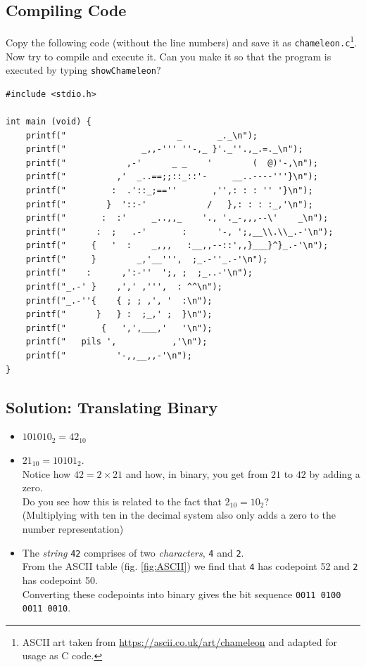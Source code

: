 \subsection*{Compiling Code}
Copy the following code (without the line numbers) and save it as \texttt{chameleon.c}\footnote{ASCII art taken from \url{https://ascii.co.uk/art/chameleon} and adapted for usage as C code.}. Now try to compile and execute it. Can you make it so that the program is executed by typing \texttt{showChameleon}?

\begin{codebox}[chameleon.c]
\begin{verbatim}
#include <stdio.h>

int main (void) {
	printf("                      _       _._\n");
	printf("               _,,-''' ''-,_ }'._''.,_.=._\n");
	printf("            ,-'      _ _    '        (  @)'-,\n");
	printf("          ,'  _..==;;::_::'-     __..----'''}\n");
	printf("         :  .'::_;==''       ,'',: : : '' '}\n");
	printf("        }  '::-'            /   },: : : :_,'\n");
	printf("       :  :'     _..,,_    '., '._-,,,--\'    _\n");
	printf("      :  ;   .-'       :      '-, ';,__\\.\\_.-'\n");
	printf("     {   '  :    _,,,   :__,,--::',,}___}^}_.-'\n");
	printf("     }        _,'__''',  ;_.-''_.-'\n");
	printf("    :      ,':-''  ';, ;  ;_..-'\n");
	printf("_.-' }    ,',' ,''',  : ^^\n");
	printf("_.-''{    { ; ; ,', '  :\n");
	printf("      }   } :  ;_,' ;  }\n");
	printf("       {   ',',___,'   '\n");
	printf("   pils ',           ,'\n");
	printf("          '-,,__,,-'\n");
}
\end{verbatim}
\end{codebox}

\newpage

\subsection*{Solution: Translating Binary}
\begin{itemize}
\item $101010_2 = 42_{10}$
\item $21_{10} = 10101_2$. \\
	Notice how $42 = 2 \times 21$ and how, in binary, you get from $21$ to $42$ by adding a zero.\\
	Do you see how this is related to the fact that $2_{10} = 10_2$?\\
	(Multiplying with ten in the decimal system also only adds a zero to the number representation)
\item The \emph{string} \texttt{42} comprises of two \emph{characters}, \texttt{4} and \texttt{2}.\\
	From the ASCII table (fig. \ref{fig:ASCII}) we find that \texttt{4} has codepoint 52 and \texttt{2} has codepoint 50.\\
	Converting these codepoints into binary gives the bit sequence \texttt{0011 0100  0011 0010}.
\end{itemize}

